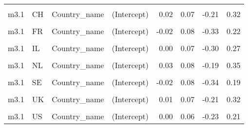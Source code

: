 \begin{table}
\begin{tabular}[t]{llllrrrr}
\cellcolor{gray!10}{m3.1} & \cellcolor{gray!10}{CA} & \cellcolor{gray!10}{Country\_name} & \cellcolor{gray!10}{EPS} & \cellcolor{gray!10}{0.01} & \cellcolor{gray!10}{0.04} & \cellcolor{gray!10}{-0.08} & \cellcolor{gray!10}{0.11}\\
m3.1 & CH & Country\_name & (Intercept) & 0.02 & 0.07 & -0.21 & 0.32\\
\cellcolor{gray!10}{m3.1} & \cellcolor{gray!10}{CH} & \cellcolor{gray!10}{Country\_name} & \cellcolor{gray!10}{EPS} & \cellcolor{gray!10}{0.04} & \cellcolor{gray!10}{0.04} & \cellcolor{gray!10}{-0.05} & \cellcolor{gray!10}{0.14}\\
m3.1 & FR & Country\_name & (Intercept) & -0.02 & 0.08 & -0.33 & 0.22\\
\cellcolor{gray!10}{m3.1} & \cellcolor{gray!10}{FR} & \cellcolor{gray!10}{Country\_name} & \cellcolor{gray!10}{EPS} & \cellcolor{gray!10}{-0.06} & \cellcolor{gray!10}{0.04} & \cellcolor{gray!10}{-0.16} & \cellcolor{gray!10}{0.03}\\
m3.1 & IL & Country\_name & (Intercept) & 0.00 & 0.07 & -0.30 & 0.27\\
\cellcolor{gray!10}{m3.1} & \cellcolor{gray!10}{IL} & \cellcolor{gray!10}{Country\_name} & \cellcolor{gray!10}{EPS} & \cellcolor{gray!10}{0.00} & \cellcolor{gray!10}{0.06} & \cellcolor{gray!10}{-0.17} & \cellcolor{gray!10}{0.17}\\
m3.1 & NL & Country\_name & (Intercept) & 0.03 & 0.08 & -0.19 & 0.35\\
\cellcolor{gray!10}{m3.1} & \cellcolor{gray!10}{NL} & \cellcolor{gray!10}{Country\_name} & \cellcolor{gray!10}{EPS} & \cellcolor{gray!10}{0.07} & \cellcolor{gray!10}{0.04} & \cellcolor{gray!10}{-0.03} & \cellcolor{gray!10}{0.18}\\
m3.1 & SE & Country\_name & (Intercept) & -0.02 & 0.08 & -0.34 & 0.19\\
\cellcolor{gray!10}{m3.1} & \cellcolor{gray!10}{SE} & \cellcolor{gray!10}{Country\_name} & \cellcolor{gray!10}{EPS} & \cellcolor{gray!10}{-0.06} & \cellcolor{gray!10}{0.04} & \cellcolor{gray!10}{-0.16} & \cellcolor{gray!10}{0.04}\\
m3.1 & UK & Country\_name & (Intercept) & 0.01 & 0.07 & -0.21 & 0.32\\
\cellcolor{gray!10}{m3.1} & \cellcolor{gray!10}{UK} & \cellcolor{gray!10}{Country\_name} & \cellcolor{gray!10}{EPS} & \cellcolor{gray!10}{0.04} & \cellcolor{gray!10}{0.04} & \cellcolor{gray!10}{-0.05} & \cellcolor{gray!10}{0.14}\\
m3.1 & US & Country\_name & (Intercept) & 0.00 & 0.06 & -0.23 & 0.21\\

\end{tabular}
\end{table}
